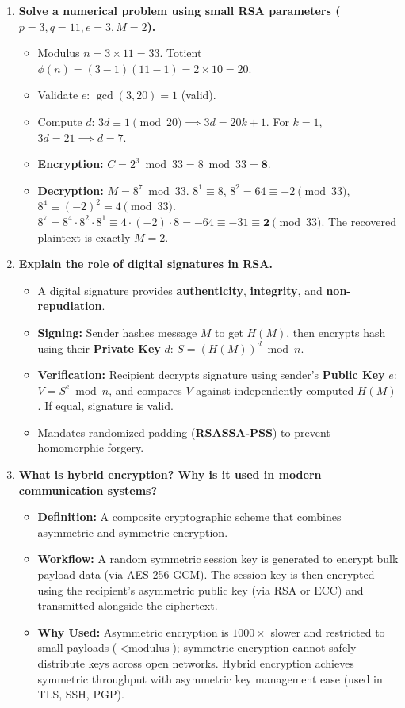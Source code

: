 \begin{enumerate}[label=\textbf{Q\arabic*.},leftmargin=1.2cm]
\item \textbf{Solve a numerical problem using small RSA parameters ($p = 3, q = 11, e = 3, M = 2$).}
\begin{itemize}
\item Modulus $n = 3 \times 11 = 33$. Totient $\phi(n) = (3-1)(11-1) = 2 \times 10 = 20$.
\item Validate $e$: $\gcd(3, 20) = 1$ (valid).
\item Compute $d$: $3d \equiv 1 \pmod{20} \implies 3d = 20k + 1$. For $k = 1$, $3d = 21 \implies d = 7$.
\item \textbf{Encryption:} $C = 2^3 \bmod 33 = 8 \bmod 33 = \mathbf{8}$.
\item \textbf{Decryption:} $M = 8^7 \bmod 33$.
$8^1 \equiv 8$, $8^2 = 64 \equiv -2 \pmod{33}$, $8^4 \equiv (-2)^2 = 4 \pmod{33}$.
$8^7 = 8^4 \cdot 8^2 \cdot 8^1 \equiv 4 \cdot (-2) \cdot 8 = -64 \equiv -31 \equiv \mathbf{2} \pmod{33}$.
The recovered plaintext is exactly $M = 2$.
\end{itemize}

\item \textbf{Explain the role of digital signatures in RSA.}
\begin{itemize}
\item A digital signature provides \textbf{authenticity}, \textbf{integrity}, and \textbf{non-repudiation}.
\item \textbf{Signing:} Sender hashes message $M$ to get $H(M)$, then encrypts hash using their \textbf{Private Key} $d$: $S = (H(M))^d \bmod n$.
\item \textbf{Verification:} Recipient decrypts signature using sender's \textbf{Public Key} $e$: $V = S^e \bmod n$, and compares $V$ against independently computed $H(M)$. If equal, signature is valid.
\item Mandates randomized padding (\textbf{RSASSA-PSS}) to prevent homomorphic forgery.
\end{itemize}

\item \textbf{What is hybrid encryption? Why is it used in modern communication systems?}
\begin{itemize}
\item \textbf{Definition:} A composite cryptographic scheme that combines asymmetric and symmetric encryption.
\item \textbf{Workflow:} A random symmetric session key is generated to encrypt bulk payload data (via AES-256-GCM). The session key is then encrypted using the recipient's asymmetric public key (via RSA or ECC) and transmitted alongside the ciphertext.
\item \textbf{Why Used:} Asymmetric encryption is $1000\times$ slower and restricted to small payloads ($< \text{modulus}$); symmetric encryption cannot safely distribute keys across open networks. Hybrid encryption achieves symmetric throughput with asymmetric key management ease (used in TLS, SSH, PGP).
\end{itemize}


\end{enumerate}
